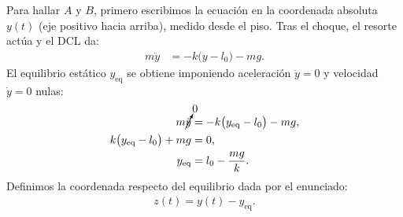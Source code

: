 \documentclass[
  11pt,
  letterpaper,
   addpoints,
  ]{exam}
\begin{document}
\begin{questions}
\begin{solution}
Para hallar $A$ y $B$, primero escribimos la ecuación en la coordenada absoluta $y(t)$ (eje positivo hacia arriba), medido desde el piso. Tras el choque, el resorte actúa y el DCL da:
\begin{align}
m\ddot{y}&=-k\big(y-l_0\big)-mg.
\end{align}
El equilibrio estático $y_{\text{eq}}$ se obtiene imponiendo aceleración $\ddot{y}=0 $ y velocidad $\dot{y}=0$ nulas:
\begin{align}
m\cancelto{0}{\ddot{y}}&=-k\big(y_{\text{eq}}-l_0\big)-mg,\\
k\big(y_{\text{eq}}-l_0\big)+mg&=0,\\
y_{\text{eq}}&=l_0-\frac{mg}{k}.
\end{align}
Definimos la coordenada respecto del equilibrio dada por el enunciado:
\begin{align}
z(t)=y(t)-y_{\text{eq}}.
\end{align}


\end{solution}
\end{questions}
\end{document}
